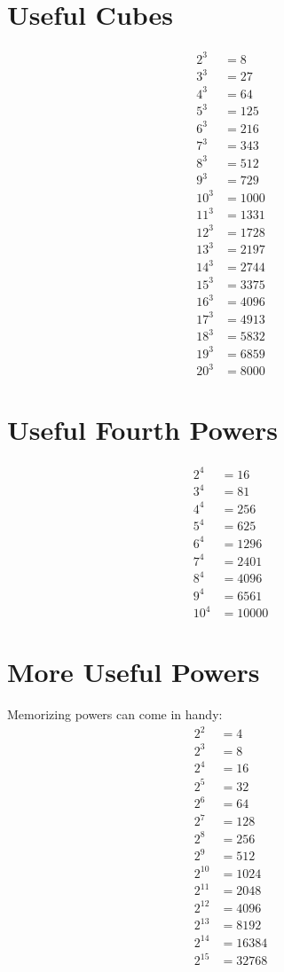\documentclass[12pt]{article}
\begin{document}
\section*{Useful Cubes}
\begin{align*}
2^3  & = 8\\
3^3  & = 27\\
4^3  & = 64\\
5^3  & = 125\\
6^3  & = 216\\
7^3  & = 343\\
8^3  & = 512\\
9^3  & = 729\\
10^3 & = 1000\\
11^3 & = 1331\\
12^3 & = 1728\\
13^3 & = 2197\\
14^3 & = 2744\\
15^3 & = 3375\\
16^3 & = 4096\\
17^3 & = 4913\\
18^3 & = 5832\\
19^3 & = 6859\\
20^3 & = 8000
\end{align*}

\section*{Useful Fourth Powers}
\begin{align*}
2^4  & = 16\\
3^4  & = 81\\
4^4  & = 256\\
5^4  & = 625\\
6^4  & = 1296\\
7^4  & = 2401\\
8^4  & = 4096\\
9^4  & = 6561\\
10^4 & = 10000
\end{align*}

\section*{More Useful Powers}
Memorizing powers can come in handy:
\begin{align*}
2^2    & = 4\\
2^3    & = 8\\
2^4    & = 16\\
2^5    & = 32\\
2^6    & = 64\\
2^7    & = 128\\
2^8    & = 256\\
2^9    & = 512\\
2^{10} & = 1024\\
2^{11} & = 2048\\
2^{12} & = 4096\\
2^{13} & = 8192\\
2^{14} & = 16384\\
2^{15} & = 32768
\end{align*}
\end{document}
